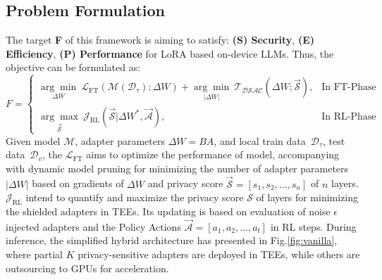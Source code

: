 \documentclass{article}
\begin{document}
\subsection{Problem Formulation}
The target \textbf{F} of this framework is aiming to satisfy: \textbf{(S) Security}, \textbf{(E) Efficiency}, \textbf{(P) Performance} for LoRA based on-device LLMs. Thus, the objective can be formulated as: 
\begin{equation}
    F = 
    \begin{cases}
        \underset{\Delta W}{\arg\min}\ \mathcal{L}_\text{FT}(\mathcal{M}(\mathcal{D}_\tau); \Delta W) + \underset{|\Delta W|}{\arg\min}\ \mathcal{T}_\mathcal{DSAC}(\Delta W;\vec{\mathcal{S}}), & \text{In FT-Phase} \\[8pt]
        \underset{\vec{\mathcal{S}}}{\arg\max}\ \mathcal{J}_\text{RL}(\vec{\mathcal{S}}|\Delta W^{*},\vec{\mathcal{A}}), & \text{In RL-Phase}
    \end{cases}
\end{equation}
Given model $\mathcal{M}$, adapter parameters $\Delta W = BA$, and local train data~$\mathcal{D}_\tau$, test data~$\mathcal{D}_v$, the $\mathcal{L}_\text{FT}$ aims to optimize the performance of model, accompanying with dynamic model pruning for minimizing the number of adapter parameters $|\Delta W|$ based on gradients of $\Delta W$ and privacy score $\vec{\mathcal{S}} = [s_1,s_2,...,s_n]$ of $n$ layers. $\mathcal{J}_\text{RL}$ intend to quantify and maximize the privacy score $\mathcal{S}$ of layers for minimizing the shielded adapters in TEEs. Its updating is based on evaluation of noise $\epsilon$ injected adapters and the Policy Actions $\vec{\mathcal{A}} = [a_1,a_2,...,a_t ]$ in RL steps. During inference, the simplified hybrid architecture has presented in Fig.\ref{fig:vanilla}, where partial $K$ privacy-sensitive adapters are deployed in TEEs, while others are outsourcing to GPUs for acceleration.
\end{document}
